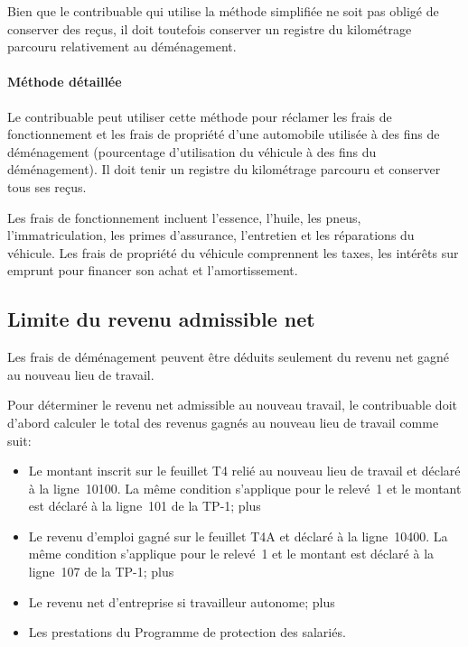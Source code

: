 Bien que le contribuable qui utilise la méthode simplifiée ne soit pas obligé de conserver des reçus, il doit toutefois conserver un registre du kilométrage parcouru relativement au déménagement.

\paragraph{Méthode détaillée}
Le contribuable peut utiliser cette méthode pour réclamer les frais de fonctionnement et les frais de propriété d'une automobile utilisée à des fins de déménagement (pourcentage d'utilisation du véhicule à des fins du déménagement). Il doit tenir un registre du kilométrage parcouru et conserver tous ses reçus.

Les frais de fonctionnement incluent l'essence, l'huile, les pneus, l'immatriculation, les primes d'assurance, l'entretien et les réparations du véhicule. Les frais de propriété du véhicule comprennent les taxes, les intérêts sur emprunt pour financer son achat et l'amortissement. 

\subsection{Limite du revenu admissible net}
Les frais de déménagement peuvent être déduits seulement du revenu net gagné au nouveau lieu de travail. 

Pour déterminer le revenu net admissible au nouveau travail, le contribuable doit d'abord calculer le total des revenus gagnés au nouveau lieu de travail comme suit:
\begin{itemize}
	\item Le montant inscrit sur le feuillet T4 relié au nouveau lieu de travail et déclaré à la ligne~10100. La même condition s'applique pour le relevé~1 et le montant est déclaré à la ligne~101 de la TP-1; plus
	\item Le revenu d'emploi gagné sur le feuillet T4A et déclaré à la ligne~10400. La même condition s'applique pour le relevé~1 et le montant est déclaré à la ligne~107 de la TP-1; plus
	\item Le revenu net d'entreprise si travailleur autonome; plus
	\item Les prestations du Programme de protection des salariés.
\end{itemize}

